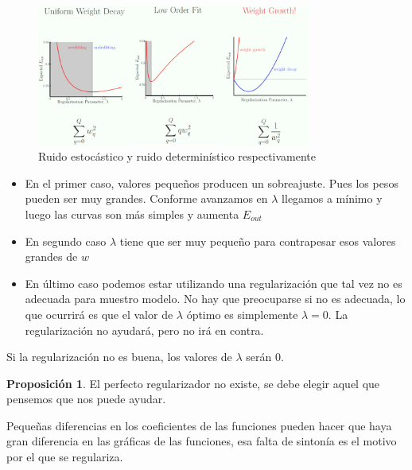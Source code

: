 \documentclass[11pt,a4paper]{article}
\theoremstyle{definition}
\newtheorem{proposition}{Proposición}[section]
\begin{document}
	\begin{figure}[H]
		\centering
		\includegraphics[width=0.8\textwidth]{images/variations_wd}
		\caption{Ruido estocástico y ruido determinístico respectivamente}
	\end{figure}
	\begin{itemize}
		\item En el primer caso, valores pequeños producen un sobreajuste. Pues los pesos pueden ser muy grandes. Conforme avanzamos en $\lambda$ llegamos a mínimo y luego las curvas son más simples y aumenta $E_{out}$
		\item En segundo caso $\lambda$ tiene que ser muy pequeño para contrapesar esos valores grandes de $w$
		\item En último caso podemos estar utilizando una regularización que tal vez no es adecuada para muestro modelo. No hay que preocuparse si no es adecuada, lo que ocurrirá es que el valor de $\lambda$ óptimo es simplemente $\lambda=0$. La regularización no ayudará, pero no irá en contra.
	\end{itemize}
	Si la regularización no es buena, los valores de $\lambda$ serán 0.\\
	
	\begin{proposition}
	El perfecto regularizador no existe, se debe elegir aquel que pensemos que nos puede ayudar. 
	\end{proposition}
	Pequeñas diferencias en los coeficientes de las funciones pueden hacer que haya gran diferencia en las gráficas de las funciones, esa falta de sintonía es el motivo por el que se regulariza.
	
\end{document}
